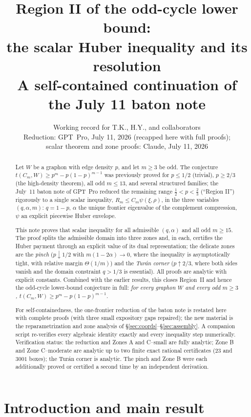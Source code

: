 \documentclass[11pt]{article}
\title{Region II of the odd-cycle lower bound:\\
the scalar Huber inequality and its resolution\\[1mm]
\large A self-contained continuation of the July 11 baton note}
\author{Working record for T.K., H.Y., and collaborators\\[1mm]
\normalsize Reduction: GPT~Pro, July 11, 2026 (recapped here with full proofs);\\
\normalsize scalar theorem and zone proofs: Claude, July 11, 2026}
\date{}
\begin{document}
\maketitle

\begin{abstract}
Let $W$ be a graphon with edge density $p$, and let $m\ge3$ be odd.  The
conjecture $t(C_m,W)\ge p^m-p(1-p)^{m-1}$ was previously proved for
$p\le1/2$ (trivial), $p\ge2/3$ (the high-density theorem), all odd $m\le13$,
and several structured families; the July~11 baton note of GPT~Pro reduced
the remaining range $\tfrac12<p<\tfrac23$ (``Region II'') rigorously to a
single scalar inequality, $R_m\le C_m\psi(\xi,\rho)$, in the three variables
$(q,\alpha,m)$: $q=1-p$, $\alpha$ the unique frontier eigenvalue of the
complement compression, $\psi$ an explicit piecewise Huber envelope.

This note proves that scalar inequality for all admissible $(q,\alpha)$ and
all odd $m\ge15$.  The proof splits the admissible domain into three zones
and, in each, certifies the Huber payment through an explicit value of its
dual representation; the delicate zones are the \emph{pinch}
($p\downarrow1/2$ with $m(1-2\alpha)\to0$, where the inequality is
asymptotically tight, with relative margin $\Theta(1/m)$) and the
\emph{Tur\'an corner} ($p\uparrow2/3$, where both sides vanish and the
domain constraint $q>1/3$ is essential).  All proofs are analytic with
explicit constants.  Combined with the earlier results, this closes
Region~II and hence the odd-cycle lower-bound conjecture in full:
\emph{for every graphon $W$ and every odd $m\ge3$,
$t(C_m,W)\ge p^m-p(1-p)^{m-1}$.}

For self-containedness, the one-frontier reduction of the baton note is
restated here with complete proofs (with three small expository gaps
repaired); the new material is the reparametrization and zone analysis of
\S\ref{sec:coords}--\S\ref{sec:assembly}.  A companion script re-verifies
every algebraic identity exactly and every inequality step numerically.
Verification status: the reduction and Zones A and C--small are fully
analytic; Zone B and Zone C--moderate are analytic up to two finite exact
rational certificates ($23$ and $3001$ boxes); the Tur\'an corner is
analytic.  The pinch and Zone B were each additionally proved or certified a
second time by an independent derivation.
\end{abstract}

{\small\tableofcontents}

\section{Introduction and main result}\label{sec:intro}
\end{document}
